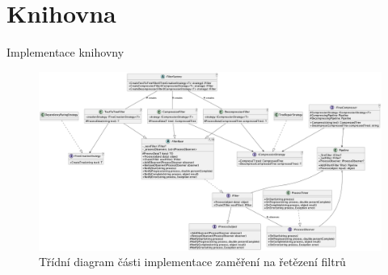 \documentclass[lualatex,hyperref={pdfencoding=auto}]{beamer}
\begin{document}



\section{Knihovna}
\begin{frame}{Implementace knihovny}
  \nocite{Oquendo2016Pipe}
    \begin{figure}
        \centering
        \includegraphics[width=\textwidth]{fig/class-diagram.png}
        \caption{Třídní diagram části implementace zaměření na řetězení filtrů}
        \label{fig:class-diagram}
    \end{figure}
\end{frame}
\end{document}
